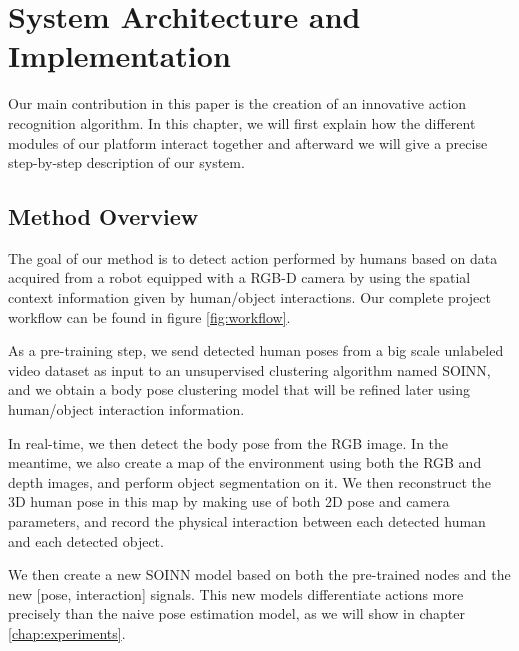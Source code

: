 \chapter{System Architecture and Implementation}
\label{chap:archi}

Our main contribution in this paper is the creation of an innovative action recognition algorithm. In this chapter, we will first explain how the different modules of our platform interact together and afterward we will give a precise step-by-step description of our system.

\section{Method Overview}
The goal of our method is to detect action performed by humans based on data acquired from a robot equipped with a RGB-D camera by using the spatial context information given by human/object interactions. Our complete project workflow can be found in figure \ref{fig:workflow}.

As a pre-training step, we send detected human poses from a big scale unlabeled video dataset as input to an unsupervised clustering algorithm named SOINN, and we obtain a body pose clustering model that will be refined later using human/object interaction information.

In real-time, we then detect the body pose from the RGB image. In the meantime, we also create a map of the environment using both the RGB and depth images, and perform object segmentation on it. We then reconstruct the 3D human pose in this map by making use of both 2D pose and camera parameters, and record the physical interaction between each detected human and each detected object.

We then create a new SOINN model based on both the pre-trained nodes and the new [pose, interaction] signals. This new models differentiate actions more precisely than the naive pose estimation model, as we will show in chapter \ref{chap:experiments}.

